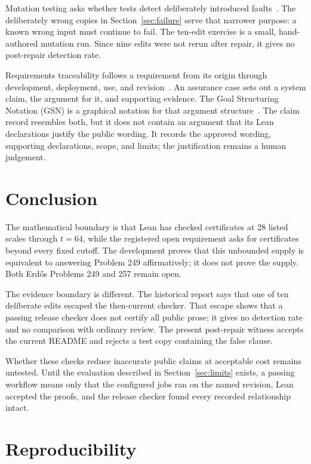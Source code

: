 \documentclass[11pt]{article}
\begin{document}
Mutation testing asks whether tests detect deliberately introduced
faults~\cite{demillo,jiaharman}.  The deliberately wrong copies in
Section~\ref{sec:failure} serve that narrower purpose: a known wrong input
must continue to fail.  The ten-edit exercise is a small, hand-authored
mutation run.  Since nine edits were not rerun after repair, it gives no
post-repair detection rate.

Requirements traceability follows a requirement from its origin through
development, deployment, use, and revision~\cite{gotel}.  An assurance case
sets out a system claim, the argument for it, and supporting evidence.  The Goal
Structuring Notation (GSN) is a graphical notation for that argument
structure~\cite{gsn}.  The claim record resembles both, but it does not contain
an argument that its Lean declarations justify the public wording.  It records
the approved wording, supporting declarations, scope, and limits; the justification remains
a human judgement.

\section{Conclusion}\label{sec:conclusion}

The mathematical boundary is that Lean has checked
certificates at 28 listed scales through \(t=64\), while the registered open
requirement asks for certificates beyond every fixed cutoff.  The development
proves that this unbounded supply is equivalent to answering Problem 249
affirmatively; it does not prove the supply.  Both Erd\H{o}s Problems 249 and 257
remain open.

The evidence boundary is different.  The historical report says
that one of ten deliberate edits escaped the then-current checker.  That
escape shows that a passing release checker does not certify all public prose;
it gives no detection rate and no comparison with ordinary review.
The present post-repair witness accepts the current README and rejects a test
copy containing the false clause.

Whether these checks reduce inaccurate public claims at acceptable cost remains
untested.  Until the evaluation described in Section~\ref{sec:limits} exists,
a passing workflow means only that the configured jobs ran on the named revision,
Lean accepted the proofs, and the release checker found every recorded
relationship intact.

\appendix
\section{Reproducibility}\label{app:repro}
\end{document}
